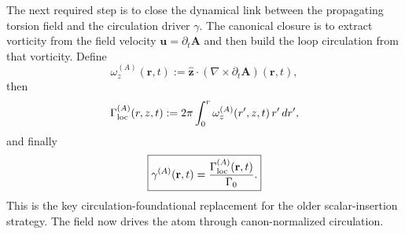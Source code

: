 \documentclass[11pt,a4paper]{article}
\begin{document}
    The next required step is to close the dynamical link between the propagating torsion field and the circulation driver $\gamma$. The canonical closure is to extract vorticity from the field velocity $\mathbf u=\partial_t\mathbf A$ and then build the loop circulation from that vorticity. Define
    \begin{equation}
        \label{eq:omegaA}
        \omega_z^{(A)}(\mathbf r,t)
        :=
        \hat{\mathbf z}\cdot\left(\nabla\times \partial_t \mathbf A\right)(\mathbf r,t),
    \end{equation}
    then
    \begin{equation}
        \label{eq:GammaA}
        \Gamma_{\rm loc}^{(A)}(r,z,t)
        :=
        2\pi\int_0^r \omega_z^{(A)}(r',z,t)\,r'\,dr',
    \end{equation}
    and finally
    \begin{equation}
        \label{eq:gammaA}
        \boxed{
            \gamma^{(A)}(\mathbf r,t)
            =
            \frac{\Gamma_{\rm loc}^{(A)}(\mathbf r,t)}{\Gamma_0}.
        }
    \end{equation}
    This is the key circulation-foundational replacement for the older scalar-insertion strategy. The field now drives the atom through canon-normalized circulation.
    
\end{document}
